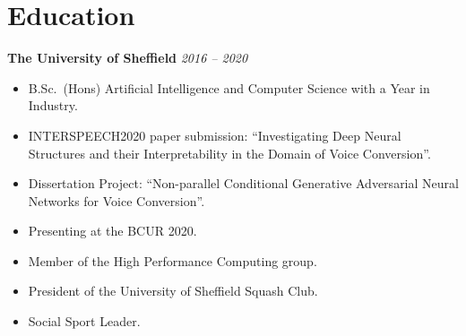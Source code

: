 \documentclass[10pt]{article} %
\begin{document}
\begin{changemargin}{0pt}{0.5pt}
\begin{minipage}[t]{0.5\textwidth}
\begin{changemargin}{5pt}{5pt}

\end{changemargin}
\end{minipage} %
\hfill
\begin{minipage}[t]{0.44\textwidth} %
\vspace{0pt} %



\section{Education}

\begin{changemargin}{5pt}{5pt}

\textbf{The University of Sheffield} \hfill \textit{ 2016 --  2020}
\vspace{-5pt}
\begin{itemize} \itemsep-2pt %
  \item B.Sc.\ (Hons) Artificial Intelligence and Computer Science with a Year in Industry.
  \item INTERSPEECH2020 paper submission: \enquote{Investigating Deep Neural Structures and their Interpretability in the Domain of Voice Conversion}.
  \item Dissertation Project: \enquote{Non-parallel Conditional Generative Adversarial Neural Networks for Voice Conversion}.
  \item Presenting at the BCUR 2020.
  \item Member of the High Performance Computing group.
  \item President of the University of Sheffield Squash Club.
  \item Social Sport Leader.
\end{itemize}

\end{changemargin}



\end{minipage}
\end{changemargin}
\end{document}
